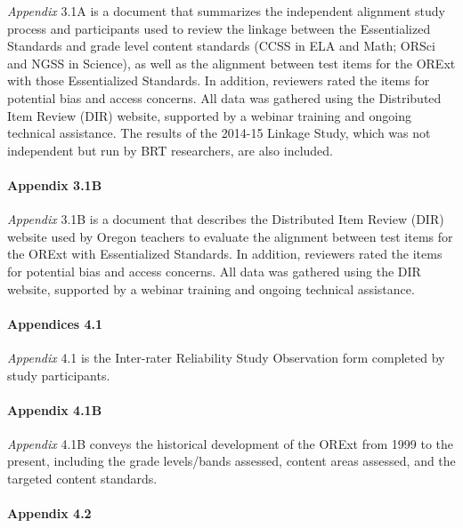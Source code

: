 \documentclass[]{article}
\let\oldparagraph\paragraph
\renewcommand{\paragraph}[1]{\oldparagraph{#1}\mbox{}}
\begin{document}
\emph{Appendix} 3.1A is a document that summarizes the independent
alignment study process and participants used to review the linkage
between the Essentialized Standards and grade level content standards
(CCSS in ELA and Math; ORSci and NGSS in Science), as well as the
alignment between test items for the ORExt with those Essentialized
Standards. In addition, reviewers rated the items for potential bias and
access concerns. All data was gathered using the Distributed Item Review
(DIR) website, supported by a webinar training and ongoing technical
assistance. The results of the 2014-15 Linkage Study, which was not
independent but run by BRT researchers, are also included.

\hypertarget{appendix-3.1b}{%
\paragraph{Appendix 3.1B}\label{appendix-3.1b}}

\emph{Appendix} 3.1B is a document that describes the Distributed Item
Review (DIR) website used by Oregon teachers to evaluate the alignment
between test items for the ORExt with Essentialized Standards. In
addition, reviewers rated the items for potential bias and access
concerns. All data was gathered using the DIR website, supported by a
webinar training and ongoing technical assistance.

\hypertarget{appendices-4.1}{%
\paragraph{Appendices 4.1}\label{appendices-4.1}}

\emph{Appendix} 4.1 is the Inter-rater Reliability Study Observation
form completed by study participants.

\hypertarget{appendix-4.1b}{%
\paragraph{Appendix 4.1B}\label{appendix-4.1b}}

\emph{Appendix} 4.1B conveys the historical development of the ORExt
from 1999 to the present, including the grade levels/bands assessed,
content areas assessed, and the targeted content standards.

\hypertarget{appendix-4.2}{%
\paragraph{Appendix 4.2}\label{appendix-4.2}}
\end{document}
